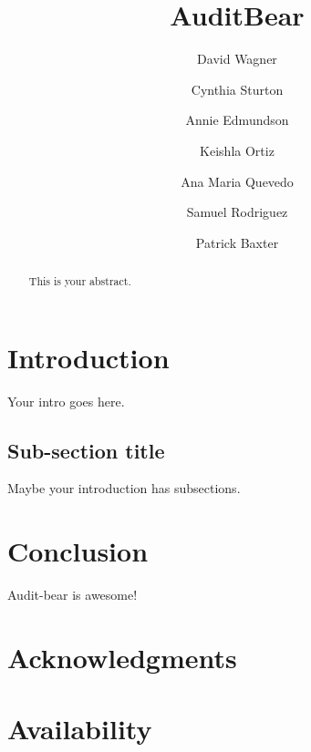\documentclass[letterpaper,twocolumn,10pt]{article}
\begin{document}
\title{AuditBear}
\author{David Wagner
\and Cynthia Sturton
\and Annie Edmundson
\and Keishla Ortiz
\and Ana Maria Quevedo
\and Samuel Rodriguez
\and Patrick Baxter}
\maketitle
\begin{abstract}
This is your abstract.
\end{abstract}

\section{Introduction}
Your intro goes here.

\subsection{Sub-section title}
Maybe your introduction has subsections.

\section{Conclusion}
Audit-bear is awesome!

\section{Acknowledgments}
\section{Availability}



\end{document}
